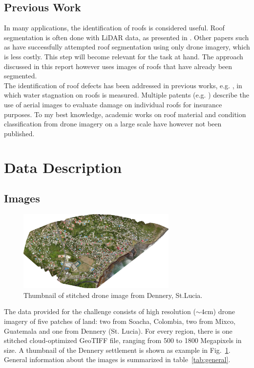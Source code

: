 \documentclass[11pt]{article}
\begin{document}
	\subsection{Previous Work}
	
	In many applications, the identification of roofs is considered useful. Roof segmentation is often done with LiDAR data, as presented in \cite{Chen2012}. Other papers such as \cite{Soman2019} have successfully attempted roof segmentation using only drone imagery, which is less costly. This step will become relevant for the task at hand. The approach discussed in this report however uses images of roofs that have already been segmented.\\
	
	The identification of roof defects has been addressed in previous works, e.g. \cite{Yudin2018}, in which water stagnation on roofs is measured. Multiple patents (e.g. \cite{Shreve2017}) describe the use of aerial images to evaluate damage on individual roofs for insurance purposes. To my best knowledge, academic works on roof material and condition classification from drone imagery on a large scale have however not been published. 
	
	\section{Data Description}
	
	\subsection{Images}
		
	\begin{figure}
		\centering		
		\includegraphics[width=0.7\textwidth]{figures/thumbnail_dennery.png}
		\caption{Thumbnail of stitched drone image from Dennery, St.Lucia.}
		\label{fig:thumbnail_dennery}
	\end{figure}

	The data provided for the challenge consists of high resolution ($\sim4$cm) drone imagery of five patches of land: two from Soacha, Colombia, two from Mixco, Guatemala and one from Dennery (St. Lucia).
	For every region, there is one stitched cloud-optimized GeoTIFF file, ranging from 500 to 1800 Megapixels in size. A thumbnail of the Dennery settlement is shown as example in Fig.~\ref{fig:thumbnail_dennery}.\\
	General information about the images is summarized in table~\ref{tab:general}.
\end{document}
